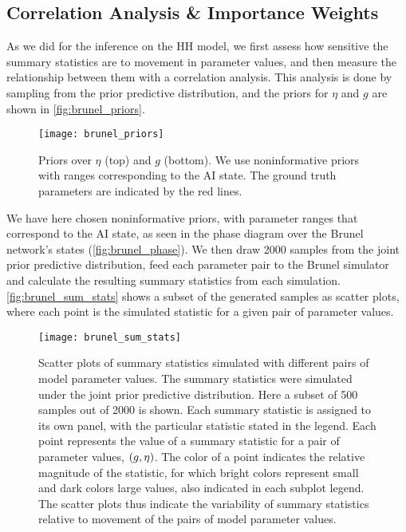 

\subsection{Correlation Analysis \& Importance Weights}

As we did for the inference on the HH model, we first assess how sensitive the summary statistics are to movement in parameter values, and then measure the relationship between them with a correlation analysis. This analysis is done by sampling from the prior predictive distribution, and the priors for $\eta$ and $g$ are shown in \autoref{fig:brunel_priors}. 
\begin{figure}[!htb]
    \centering
    \texttt{[image: brunel\_priors]}
    \caption{Priors over $\eta$ (top) and $g$ (bottom). We use noninformative priors with ranges corresponding to the AI state. The ground truth parameters are indicated by the red lines. 
    }
    \label{fig:brunel_priors}
\end{figure}
We have here chosen noninformative priors, with parameter ranges that correspond to the AI state, as seen in the phase diagram over the Brunel network's states (\autoref{fig:brunel_phase}). We then draw 2000 samples from the joint prior predictive distribution, feed each parameter pair to the Brunel simulator and calculate the resulting summary statistics from each simulation. \autoref{fig:brunel_sum_stats} shows a subset of the generated samples as scatter plots, where each point is the simulated statistic for a given pair of parameter values. 
\begin{figure}[!htb]
    \centering
    \texttt{[image: brunel\_sum\_stats]}
    \caption{Scatter plots of summary statistics simulated with different pairs of model parameter values. The summary statistics were simulated under the joint prior predictive distribution. Here a subset of 500 samples out of 2000 is shown. Each summary statistic is assigned to its own panel, with the particular statistic stated in the legend. Each point represents the value of a summary statistic for a pair of parameter values, $\qty(g, \eta)$. The color of a point indicates the relative magnitude of the statistic, for which bright colors represent small and dark colors large values, also indicated in each subplot legend. The scatter plots thus indicate the variability of summary statistics relative to movement of the pairs of model parameter values.
    }
    \label{fig:brunel_sum_stats}
\end{figure}
